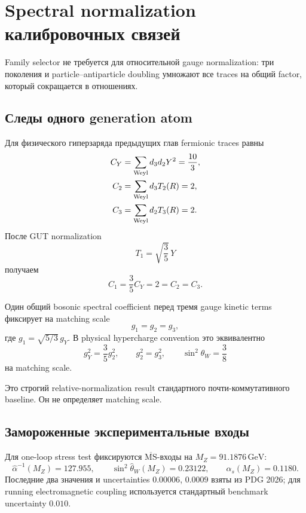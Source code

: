 \chapter{Spectral normalization калибровочных связей}

Family selector не требуется для относительной gauge normalization: три
поколения и particle--antiparticle doubling умножают все traces на общий
factor, который сокращается в отношениях.

\section{Следы одного generation atom}

Для физического гиперзаряда предыдущих глав fermionic traces равны
\begin{align}
C_Y&=\sum_{\rm Weyl}d_3d_2Y^2=\frac{10}{3},\\
C_2&=\sum_{\rm Weyl}d_3T_2(R)=2,\\
C_3&=\sum_{\rm Weyl}d_2T_3(R)=2.
\end{align}
После GUT normalization
\begin{equation}
T_1=\sqrt{\frac35}\,Y
\end{equation}
получаем
\begin{equation}
C_1=\frac35C_Y=2=C_2=C_3.
\end{equation}

\begin{theorem}
Один общий bosonic spectral coefficient перед тремя gauge kinetic terms
фиксирует на matching scale
\begin{equation}
\boxed{g_1=g_2=g_3,}
\end{equation}
где \(g_1=\sqrt{5/3}\,g_Y\). В physical hypercharge convention это
эквивалентно
\begin{equation}
g_Y^2=\frac35g_2^2,
\qquad
g_2^2=g_3^2,
\qquad
\sin^2\theta_W=\frac38
\end{equation}
на matching scale.
\end{theorem}

Это строгий relative-normalization result стандартного почти-коммутативного
baseline. Он не определяет matching scale.

\section{Замороженные экспериментальные входы}

Для one-loop stress test фиксируются \(\overline{\mathrm{MS}}\)-входы на
\(M_Z=91.1876\,\mathrm{GeV}\):
\begin{equation}
\widehat\alpha^{-1}(M_Z)=127.955,
\qquad
\sin^2\widehat\theta_W(M_Z)=0.23122,
\qquad
\alpha_s(M_Z)=0.1180.
\end{equation}
Последние два значения и uncertainties \(0.00006\), \(0.0009\) взяты из
PDG 2026; для running electromagnetic coupling используется стандартный
benchmark uncertainty \(0.010\).

